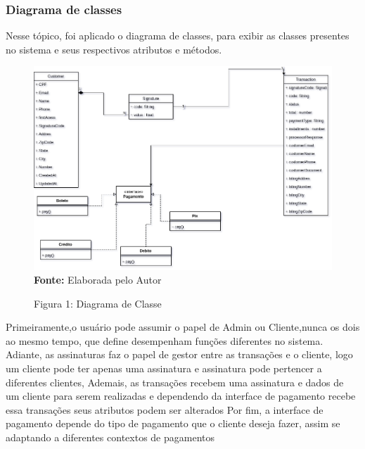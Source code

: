 \documentclass[a4paper,12pt]{article}
\begin{document}
\subsubsection{Diagrama de classes}
\hspace{0.5cm}Nesse tópico, foi aplicado o diagrama de classes, para exibir as classes presentes no
sistema e seus respectivos atributos e métodos.

\begin{figure}[ht!]
    \centering
    \caption{Figura 1: Diagrama de Classe}
    \includegraphics[width=15cm]{imagens/diagrama de Classe.png}
    \textbf{Fonte:} Elaborada pelo Autor
\end{figure}

\hspace{0.5cm}Primeiramente,o usuário pode assumir o papel de Admin ou Cliente,nunca os dois ao mesmo tempo, que define desempenham funções diferentes no sistema.
Adiante, as assinaturas faz o papel de gestor entre as transações e o cliente, logo um cliente pode ter apenas uma assinatura e assinatura pode pertencer a diferentes clientes,
Ademais, as transações recebem uma assinatura e dados de um cliente para serem realizadas e dependendo da interface de pagamento recebe essa transações seus atributos podem ser alterados
Por fim, a interface de pagamento depende do tipo de pagamento que o cliente deseja fazer, assim se adaptando a diferentes contextos de pagamentos

\newpage
\end{document}
